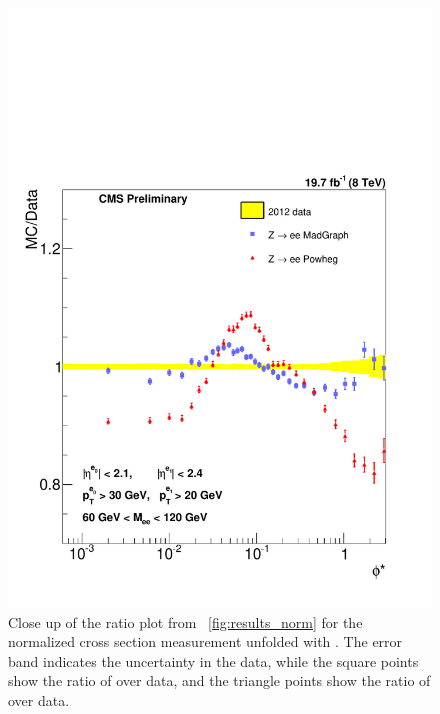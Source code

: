 \begin{figure}[!p]
    \centering
    \includegraphics[width=\textwidth]{figures/ZShape_Ratioelec_Norm_Dressed.pdf}
    \caption[
        Close up of the ratio plot from \FIG~\ref{fig:results_norm} for the
        normalized cross section measurement unfolded with \MADGRAPH.
    ]{
        Close up of the ratio plot from \FIG~\ref{fig:results_norm} for the
        normalized cross section measurement unfolded with \MADGRAPH. The error
        band indicates the uncertainty in the data, while the square points
        show the ratio of \MADGRAPH over data, and the triangle points show the
        ratio of \POWHEG over data.
    }
    \label{fig:results_ratio_norm}
\end{figure}
